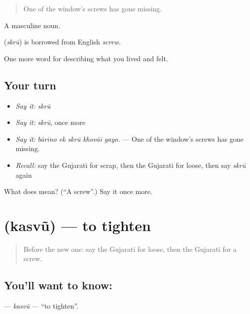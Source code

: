\begin{quote}
One of the window's screws has gone missing.
\end{quote}

A masculine noun.

\begin{cousinweb}
\textbf{} (\emph{skrū}) is borrowed from English \emph{screw}.
\end{cousinweb}

\begin{grammarlens}[title={What you've built}]
One more word for describing what you lived and felt.
\end{grammarlens}

\subsection*{Your turn}
\begin{itemize}
\raggedright
  \item \emph{Say it:} \emph{skrū}
  \item \emph{Say it:} \emph{skrū}, once more
  \item \emph{Say it:} \emph{bārīno ek skrū khovāī gayo.} — One of the window's screws has gone missing.
  \item \emph{Recall:} say the Gujarati for scrap, then the Gujarati for loose, then say \emph{skrū} again
\end{itemize}

\begin{tcolorbox}[breakable,colback=teal!4,colframe=teal!35!black,title={Before you move on}]
What does  mean? (\textquotedblleft{}A screw\textquotedblright{}.) Say it once more.
\end{tcolorbox}
\section[\texorpdfstring{\gu{કસવું} (kasvũ)}{કસવું (kasvũ)}]{ (kasvũ) — to tighten}

\label{lesson:GU-C514-kasvu}



\begin{quote}
Before the new one: say the Gujarati for loose, then the Gujarati for a screw.
\end{quote}

\subsection*{You'll want to know: }
\textbf{} — \emph{kasvũ} — \textquotedblleft{}to tighten\textquotedblright{}.

